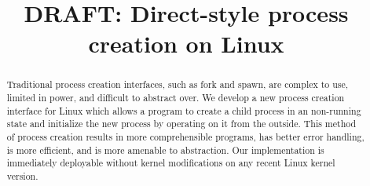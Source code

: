 \documentclass[letterpaper,twocolumn,10pt]{article}
\begin{document}
\newcommand{\twosigma}{[tech company]} 
\date{}
\title{\Large \bf DRAFT: Direct-style process creation on Linux}
\maketitle
\begin{abstract}
Traditional process creation interfaces,
such as fork and spawn,
are complex to use, limited in power, and difficult to abstract over.
We develop a new process creation interface for Linux
which allows a program to create a child process in an non-running state
and initialize the new process by operating on it from the outside.
This method of process creation results in more comprehensible programs, 
has better error handling,
is more efficient,
and is more amenable to abstraction.
Our implementation is immediately deployable without kernel modifications on any recent Linux kernel version.
\end{abstract}
\end{document}
